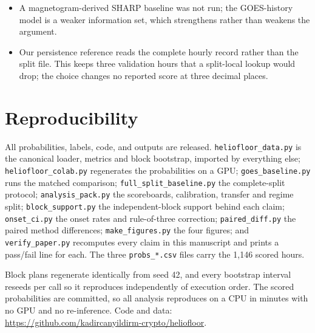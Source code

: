 \documentclass[11pt]{article}
\newcommand{\code}[1]{\texttt{#1}}
\begin{document}
\begin{itemize}
confirmatory fp32 run, so we bounded instead what one could change
(\code{precision\_sensitivity.py}). At the shipped 0.5 threshold \textbf{no hour
in either split lies within $10^{-3}$ of the decision boundary}, the closest are
0.0059 (validation) and 0.0039 (test) away, and an adversarial worst case in
which every hour within $10^{-2}$ flips the damaging way moves TSS by at most
0.002 and 0.008 respectively. At the tuned thresholds the same worst case moves
TSS by at most 0.033. Against intervals 0.46--0.81 wide these are immaterial. The
zero-catch observation of Section~\ref{sec:onset} is safer still: the largest
probability among the 27 test onset hours is 0.332, a margin of 0.168 below the
threshold. A confirmatory fp32 run remains desirable, but no conclusion here
depends on it.
\item A magnetogram-derived SHARP baseline was not run; the GOES-history model is
a weaker information set, which strengthens rather than weakens the argument.
\item Our persistence reference reads the complete hourly record rather than the
split file. This keeps three validation hours that a split-local lookup would
drop; the choice changes no reported score at three decimal places.
\end{itemize}

\section{Reproducibility}

\begin{sloppypar}
All probabilities, labels, code, and outputs are released. \code{heliofloor\_data.py}
is the canonical loader, metrics and block bootstrap, imported by everything else;
\code{heliofloor\_colab.py} regenerates the probabilities on a GPU;
\code{goes\_baseline.py} runs the matched comparison; \code{full\_split\_baseline.py}
the complete-split protocol; \code{analysis\_pack.py} the scoreboards, calibration,
transfer and regime split; \code{block\_support.py} the independent-block support
behind each claim; \code{onset\_ci.py} the onset rates and rule-of-three
correction; \code{paired\_diff.py} the paired method differences; \code{make\_figures.py} the four figures; and \code{verify\_paper.py}
recomputes every claim in this manuscript and prints a pass/fail line for each.
The three \code{probs\_*.csv} files carry the 1{,}146 scored hours.
\end{sloppypar}

Block plans regenerate identically from seed 42, and every bootstrap interval
reseeds per call so it reproduces independently of execution order. The scored
probabilities are committed, so all analysis reproduces on a CPU in minutes
with no GPU and no re-inference. Code and data:
\url{https://github.com/kadircanyildirm-crypto/heliofloor}.
\end{document}
